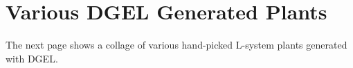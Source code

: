 \chapter{Various DGEL Generated Plants}
\label{app:plants}

The next page shows a collage of various hand-picked \gls{L-system} plants generated with \gls{DGEL}.


